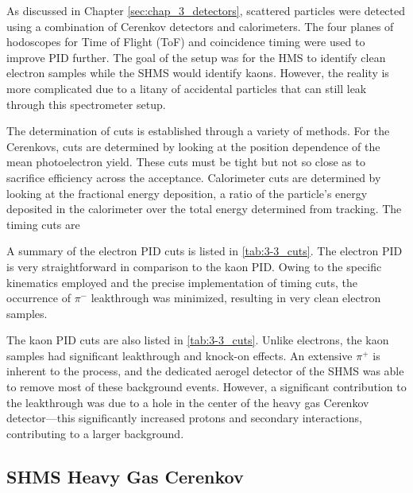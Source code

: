 \documentclass[
]{report}
\begin{document}
As discussed in Chapter \ref{sec:chap_3_detectors}, scattered particles
were detected using a combination of Cerenkov detectors and
calorimeters. The four planes of hodoscopes for Time of Flight (ToF) and
coincidence timing were used to improve PID further. The goal of the
setup was for the HMS to identify clean electron samples while the SHMS
would identify kaons. However, the reality is more complicated due to a
litany of accidental particles that can still leak through this
spectrometer setup.





The determination of cuts is established through a variety of methods.
For the Cerenkovs, cuts are determined by looking at the position
dependence of the mean photoelectron yield. These cuts must be tight but
not so close as to sacrifice efficiency across the acceptance.
Calorimeter cuts are determined by looking at the fractional energy
deposition, a ratio of the particle's energy deposited in the
calorimeter over the total energy determined from tracking. The timing
cuts are



A summary of the electron PID cuts is listed in \ref{tab:3-3_cuts}. The
electron PID is very straightforward in comparison to the kaon PID.
Owing to the specific kinematics employed and the precise implementation
of timing cuts, the occurrence of \(\pi^-\) leakthrough was minimized,
resulting in very clean electron samples.



The kaon PID cuts are also listed in \ref{tab:3-3_cuts}. Unlike
electrons, the kaon samples had significant leakthrough and knock-on
effects. An extensive \(\pi^+\) is inherent to the process, and the
dedicated aerogel detector of the SHMS was able to remove most of these
background events. However, a significant contribution to the
leakthrough was due to a hole in the center of the heavy gas Cerenkov
detector---this significantly increased protons and secondary
interactions, contributing to a larger background.

\hypertarget{shms-heavy-gas-cerenkov}{%
\subsection{SHMS Heavy Gas Cerenkov}\label{shms-heavy-gas-cerenkov}}
\end{document}
